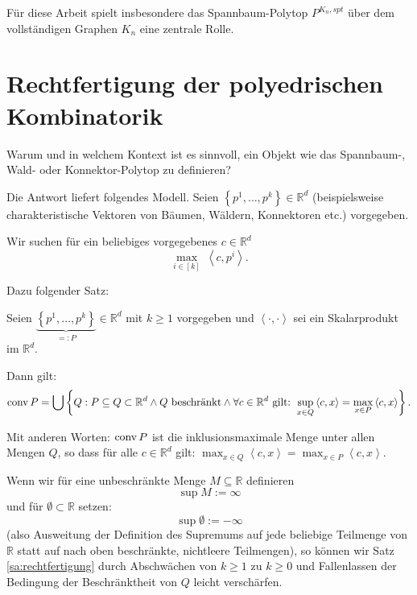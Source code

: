 \documentclass[10p,a4paper,BCOR = 12mm, DIV=15]{scrbook}
\begin{document}
Für diese Arbeit spielt insbesondere das Spannbaum-Polytop $P^{K_n, spt}$ über dem voll\-ständigen Graphen $K_n$ eine zentrale Rolle.

\section{Rechtfertigung der polyedrischen Kombinatorik}

Warum und in welchem Kontext ist es sinnvoll, ein Objekt wie das Spannbaum-, Wald- oder Konnektor-Polytop zu definieren?

Die Antwort liefert folgendes Modell. Seien $\left\{p^1, \ldots, p^k\right\} \in \mathbb{R}^d$ (beispielsweise charakteristische Vektoren von Bäumen, Wäldern, Konnektoren etc.) vorgegeben.

Wir suchen für ein beliebiges vorgegebenes $c \in \mathbb{R}^d$
\begin{displaymath}
\max_{i \in \left[k\right]}\ \left\langle c, p^i\right\rangle.
\end{displaymath}

Dazu folgender Satz:
\begin{Sa}
\label{sa:rechtfertigung}
Seien $\underbrace{\left\{p^1, \ldots, p^k\right\}}_{=: P} \in \mathbb{R}^d$ mit $k \geq 1$ vorgegeben und $\left\langle\cdot, \cdot\right\rangle$ sei ein Skalarprodukt im $\mathbb{R}^d$.

Dann gilt:
\begin{displaymath}
\operatorname{conv} P = \bigcup \left\{Q: P \subseteq Q \subset \mathbb{R}^d \wedge Q \textnormal{ beschränkt} \wedge \forall c \in \mathbb{R}^d\textnormal{ gilt: } \sup_{x \in Q} \left\langle c, x\right\rangle = \max_{x \in P} \left\langle c, x\right\rangle\right\}.
\end{displaymath}

Mit anderen Worten: $\operatorname{conv} P$ ist die inklusionsmaximale Menge unter allen Mengen $Q$, so dass für alle $c \in \mathbb{R}^d$ gilt: $\max_{x \in Q} \left\langle c, x\right\rangle = \max_{x \in P} \left\langle c, x\right\rangle$.
\end{Sa}

\begin{Bem}
Wenn wir für eine unbeschränkte Menge $M \subseteq \mathbb{R}$ definieren
\begin{displaymath}
\sup M := \infty
\end{displaymath}
und für $\emptyset \subset \mathbb{R}$ setzen:
\begin{displaymath}
\sup \emptyset := -\infty
\end{displaymath}
(also Ausweitung der Definition des Supremums auf jede beliebige Teilmenge von $\mathbb{R}$ statt auf nach oben beschränkte, nichtleere Teilmengen), so können wir Satz \ref{sa:rechtfertigung} durch Abschwächen von $k \geq 1$ zu $k\geq 0$ und Fallenlassen der Bedingung der Beschränktheit von $Q$ leicht verschärfen.
\end{Bem}
\end{document}
